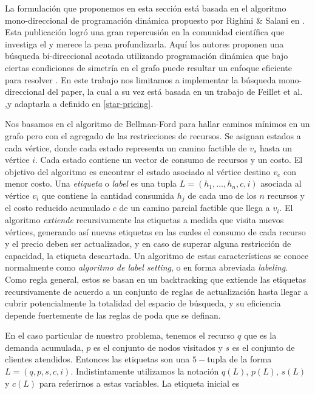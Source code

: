 La formulación que proponemos en esta sección está basada en el algoritmo mono-direccional de programación dinámica propuesto por Righini \& Salani en \cite{righini-salani}. Esta publicación logró una gran repercusión en la comunidad científica que investiga el  y merece la pena profundizarla.  Aquí los autores proponen una búsqueda bi-direccional acotada utilizando programación dinámica que bajo ciertas condiciones de simetría en el grafo puede resultar un enfoque eficiente para resolver . En este trabajo nos limitamos a implementar la búsqueda mono-direccional del paper, la cual a su vez está basada en un trabajo de Feillet et al. \cite{feillet-et-al},y adaptarla a  definido en \ref{star-pricing}.

Nos basamos en el algoritmo de Bellman-Ford para hallar caminos mínimos en un grafo pero con el agregado de las restricciones de recursos. Se asignan estados a cada vértice, donde cada estado representa un camino factible de $v_s$ hasta un vértice $i$. Cada estado contiene un vector de consumo de recursos y un costo. El objetivo del algoritmo es encontrar el estado asociado al vértice destino $v_e$ con menor costo.      
Una \emph{etiqueta} o \emph{label} es una tupla $L = (h_1, \dots, h_n, c, i)$ asociada al vértice $v_i$ que contiene la cantidad consumida $h_j$ de cada uno de los $n$ recursos y el costo reducido acumulado $c$ de un camino parcial factible que llega a $v_i$. El algoritmo \emph{extiende} recursivamente las etiquetas a medida que visita nuevos vértices, generando así nuevas etiquetas en las cuales el consumo de cada recurso y el precio deben ser actualizados, y en caso de superar alguna restricción de capacidad, la etiqueta descartada. Un algoritmo de estas características se conoce normalmente como \emph{algoritmo de label setting}, o en forma abreviada \emph{labeling}. Como regla general, estos se basan en un backtracking que extiende las etiquetas recursivamente de acuerdo a un conjunto de reglas de actualización hasta llegar a cubrir potencialmente la totalidad del espacio de búsqueda, y su eficiencia depende fuertemente de las reglas de poda que se definan.

En el caso particular de nuestro problema, tenemos el recurso $q$ que es la demanda acumulada, $p$ es el conjunto de nodos visitados y $s$ es el conjunto de clientes atendidos. Entonces las etiquetas son una $5-$tupla de la forma $L = (q, p, s, c, i)$. Indistintamente utilizamos la notación $q(L)$, $p(L)$, $s(L)$ y $c(L)$ para referirnos a estas variables. La etiqueta inicial es 

